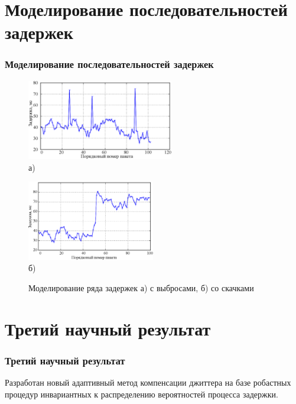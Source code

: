 \documentclass[10pt,pdf,hyperref={unicode}]{beamer}
\begin{document}
\section{Моделирование последовательностей задержек}
\begin{frame}
\frametitle{Моделирование последовательностей задержек}
\begin{figure} [h]
\begin{minipage}[h]{0.47\linewidth}
\center
\includegraphics[width=1\linewidth , height=3.5cm]{3chapter/3_1_a.eps} \\{\scriptsize а)} \\
\end{minipage}
\hfill
\begin{minipage}[h]{0.47\linewidth}
\center
\includegraphics[width=1\linewidth, height=3.5cm]{3chapter/3_1_b.eps} \\{\scriptsize б)} \\
\end{minipage}
\caption*{Моделирование ряда задержек а) с выбросами, б) со скачками}
\label{img3:modelJitter}
\end{figure}
\end{frame}


\section{Третий научный результат}

\begin{frame}
\frametitle{Третий научный результат}

{\Large Разработан новый адаптивный метод компенсации джиттера на базе робастных процедур инвариантных к распределению вероятностей процесса задержки.}

\end{frame}
\end{document}
